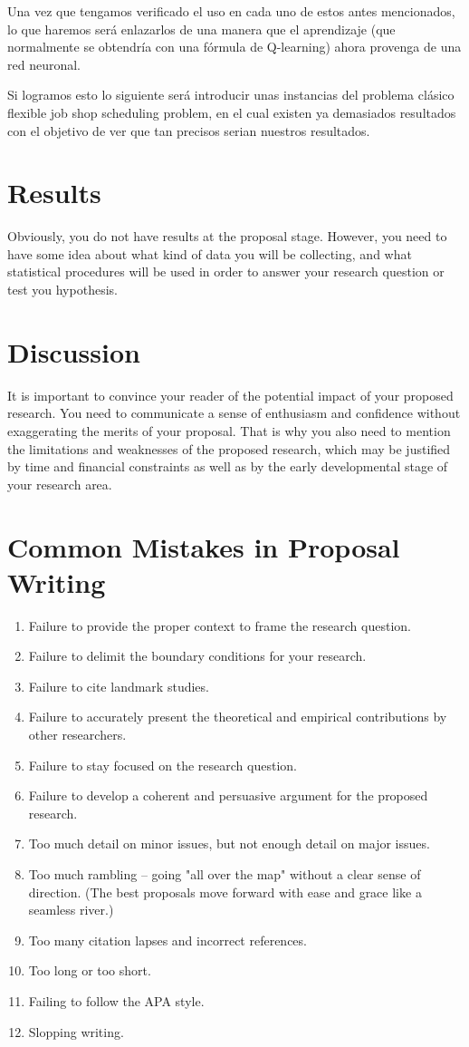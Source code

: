 \documentclass[letterpaper, 10 pt]{article}
\begin{document}
Una vez que tengamos verificado el uso en cada uno de estos antes  mencionados, lo que haremos será enlazarlos de una manera que el aprendizaje (que normalmente se obtendría con una fórmula de Q-learning) ahora provenga de una red neuronal.

Si logramos esto lo siguiente será introducir unas instancias del problema clásico flexible job shop scheduling problem, en el cual existen ya demasiados resultados con el objetivo  de ver que tan precisos serian nuestros resultados.
\section{Results}
Obviously, you do not have results at the proposal stage. However, you need to have
some idea about what kind of data you will be collecting, and what statistical
procedures will be used in order to answer your research question or test you
hypothesis.
\section{Discussion}
It is important to convince your reader of the potential impact of your proposed
research. You need to communicate a sense of enthusiasm and confidence without
exaggerating the merits of your proposal. That is why you also need to mention the
limitations and weaknesses of the proposed research, which may be justified by time
and financial constraints as well as by the early developmental stage of your
research area.
\section*{Common Mistakes in Proposal Writing}
\begin{enumerate}
	\item Failure to provide the proper context to frame the research question.
	\item Failure to delimit the boundary conditions for your research.
	\item Failure to cite landmark studies.
	\item Failure to accurately present the theoretical and empirical contributions by other researchers.
	\item Failure to stay focused on the research question.
	\item Failure to develop a coherent and persuasive argument for the proposed research.
	\item Too much detail on minor issues, but not enough detail on major issues.
	\item Too much rambling -- going "all over the map" without a clear sense of direction. (The best proposals move forward with ease and grace like a seamless river.)
	\item Too many citation lapses and incorrect references.
	\item Too long or too short.
	\item Failing to follow the APA style.
	\item Slopping writing.
\end{enumerate}
\end{document}
